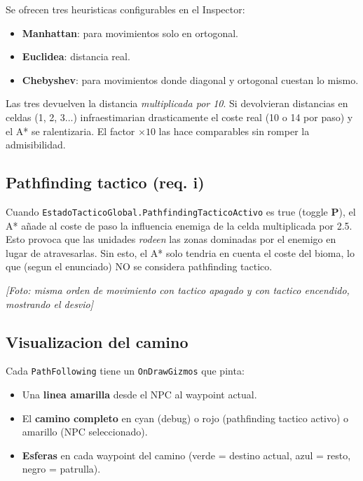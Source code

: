 \documentclass[12pt,a4paper]{article}
\newcommand{\fotoplaceholder}[1]{%
    \par\medskip\noindent%
    \begin{center}%
    \begin{tcolorbox}[
        colback=fotobg,
        colframe=fotoborder,
        boxrule=0.8pt,
        arc=2pt,
        width=0.85\textwidth,
        halign=center,
        valign=center,
        height=2.4cm
    ]
    \itshape\color{gray} [Foto: #1]
    \end{tcolorbox}%
    \end{center}\medskip%
}
\begin{document}
Se ofrecen tres heuristicas configurables en el Inspector:

\begin{itemize}[leftmargin=1.5em]
    \item \textbf{Manhattan}: para movimientos solo en ortogonal.
    \item \textbf{Euclidea}: distancia real.
    \item \textbf{Chebyshev}: para movimientos donde diagonal y ortogonal cuestan lo mismo.
\end{itemize}

Las tres devuelven la distancia \emph{multiplicada por 10}. Si
devolvieran distancias en celdas (1, 2, 3...) infraestimarian
drasticamente el coste real (10 o 14 por paso) y el A* se ralentizaria.
El factor $\times 10$ las hace comparables sin romper la admisibilidad.

\subsection{Pathfinding tactico (req. i)}

Cuando \texttt{EstadoTacticoGlobal.PathfindingTacticoActivo} es true
(toggle \textbf{P}), el A* añade al coste de paso la influencia enemiga
de la celda multiplicada por 2.5. Esto provoca que las unidades
\emph{rodeen} las zonas dominadas por el enemigo en lugar de
atravesarlas. Sin esto, el A* solo tendria en cuenta el coste del
bioma, lo que (segun el enunciado) NO se considera pathfinding tactico.

\fotoplaceholder{misma orden de movimiento con tactico apagado y con tactico encendido, mostrando el desvio}

\subsection{Visualizacion del camino}

Cada \texttt{PathFollowing} tiene un \texttt{OnDrawGizmos} que pinta:

\begin{itemize}[leftmargin=1.5em]
    \item Una \textbf{linea amarilla} desde el NPC al waypoint actual.
    \item El \textbf{camino completo} en cyan (debug) o rojo (pathfinding tactico activo) o amarillo (NPC seleccionado).
    \item \textbf{Esferas} en cada waypoint del camino (verde = destino actual, azul = resto, negro = patrulla).
\end{itemize}
\end{document}
